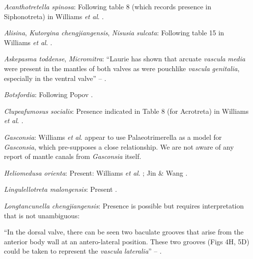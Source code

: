 \documentclass[openany]{book}
\theoremstyle{definition}
\theoremstyle{definition}
\theoremstyle{definition}
\theoremstyle{remark}
\begin{document}
\hypertarget{Acanthotretella_spinosa-coding-26}{}
\emph{Acanthotretella spinosa}: Following table 8 (which records
presence in Siphonotreta) in Williams \emph{et al}.
\citeyearpar{Williams2000LinguliformeaCraniiformea}.

\hypertarget{Alisina-coding-26}{}
\emph{Alisina}, \emph{Kutorgina chengjiangensis}, \emph{Nisusia
sulcata}: Following table 15 in Williams \emph{et al}.
\citeyearpar{Williams2000LinguliformeaCraniiformea}.

\hypertarget{Askepasma_toddense-coding-26}{}
\emph{Askepasma toddense}, \emph{Micromitra}: ``Laurie
\citeyearpar{Laurie1987Themusculature} has shown that arcuate
\emph{vascula} \emph{media} were present in the mantles of both valves
as were pouchlike \emph{vascula} \emph{genitalia}, especially in the
ventral valve'' -- \citet{Williams1997Introduction}.

\hypertarget{Botsfordia-coding-26}{}
\emph{Botsfordia}: Following Popov \citeyearpar{Popov1992TheCambrian}.

\hypertarget{Clupeafumosus_socialis-coding-26}{}
\emph{Clupeafumosus socialis}: Presence indicated in Table 8 (for
Acrotreta) in Williams \emph{et al}.
\citeyearpar{Williams2000LinguliformeaCraniiformea}.

\hypertarget{Gasconsia-coding-26}{}
\emph{Gasconsia}: Williams \emph{et al}. \citeyearpar[table
15]{Williams2000LinguliformeaCraniiformea} appear to use
Palaeotrimerella \citep[as drawn in][]{Williams1997Introduction} as a
model for \emph{Gasconsia}, which pre-supposes a close relationship. We
are not aware of any report of mantle canals from \emph{Gasconsia}
itself.

\hypertarget{Heliomedusa_orienta-coding-26}{}
\emph{Heliomedusa orienta}: Present: Williams \emph{et al}.
\citeyearpar{Williams2000LinguliformeaCraniiformea}; Jin \& Wang
\citeyearpar{Jin1992Revisionof}.

\hypertarget{Lingulellotreta_malongensis-coding-26}{}
\emph{Lingulellotreta malongensis}: Present
\citep{Williams2000LinguliformeaCraniiformea}.

\hypertarget{Longtancunella_chengjiangensis-coding-26}{}
\emph{Longtancunella chengjiangensis}: Presence is possible but requires
interpretation that is not unambiguous:

``In the dorsal valve, there can be seen two baculate grooves that arise
from the\\
anterior body wall at an antero-lateral position. These two grooves
(Figs 4H, 5D) could be taken to represent the \emph{vascula}
\emph{lateralia}'' -- \citet{Zhang2007Agregarious}.
\end{document}
